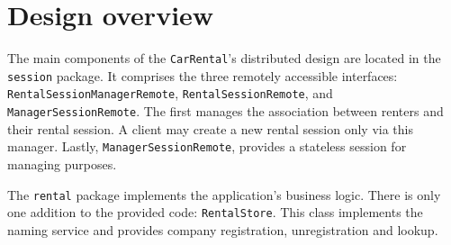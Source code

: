 \section{Design overview}
The main components of the \texttt{CarRental}'s distributed design are located in the \texttt{session} package. It comprises the three remotely accessible interfaces: \texttt{RentalSessionManagerRemote}, \texttt{RentalSessionRemote}, and \texttt{ManagerSessionRemote}. The first manages the association between renters and their rental session. A client may create a new rental session only via this manager. Lastly, \texttt{ManagerSessionRemote}, provides a stateless session for managing purposes. 

The \texttt{rental} package implements the application's business logic. There is only one addition to the provided code: \texttt{RentalStore}. This class implements the naming service and provides company registration, unregistration and lookup.